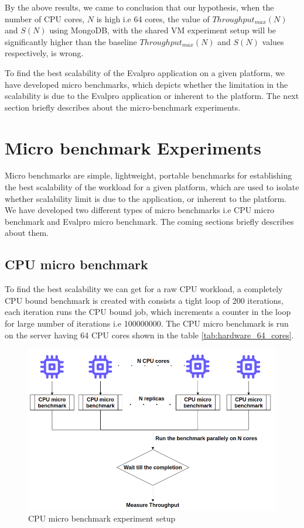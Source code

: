 \documentclass[sigconf]{acmart}
\begin{document}
By the above results, we came to conclusion that our hypothesis, when the number of CPU cores, $N$ is high i.e 64 cores, the value of  $Throughput_{max}(N)$ and $S(N)$ using MongoDB, with the shared VM experiment setup will be significantly higher than the baseline  $Throughput_{max}(N)$ and $S(N)$ values respectively, is wrong.

To find the best scalability  of the Evalpro application on a given platform, we have developed micro benchmarks, which depicts whether the limitation in the scalability is due to the Evalpro application or inherent to the platform. The next section briefly describes about the micro-benchmark experiments.

\section{Micro benchmark Experiments}\label{micro_benchmark_exps}
Micro benchmarks are simple, lightweight, portable benchmarks for establishing the best
scalability of the workload for a given platform, which are used to isolate whether scalability limit is due to the application, or inherent to the platform. We have developed two different types of micro benchmarks i.e CPU micro benchmark and Evalpro micro benchmark. The coming sections briefly describes about them.
\subsection{CPU micro benchmark}
To find the best scalability we can get for a raw CPU workload, a completely CPU bound benchmark is created with consists a tight loop of 200 iterations, each iteration runs the CPU bound job, which increments a counter in the loop for large number  of iterations i.e 100000000. The CPU micro benchmark is run on the server having 64 CPU cores shown in the table \ref{tab:hardware_64_cores}. 

\begin{figure}[!htb]
  \centering
  \includegraphics[width=\linewidth]{Pictures/cpu_micro_benchmark.png}
  \caption{CPU micro benchmark experiment setup}
  \label{cpu_micro_bench_mark}
\end{figure}
\end{document}
